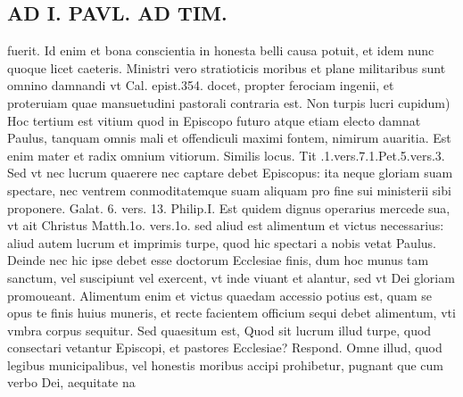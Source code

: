 \documentclass{article}
\begin{document}
\begin{pages}
\section*{AD I. PAVL. AD TIM. }
\marginpar{[ p.138. ]}\pstart fuerit. Id enim et bona conscientia in honesta belli causa potuit, et idem nunc quoque licet caeteris. Ministri vero stratioticis moribus et plane militaribus sunt omnino damnandi vt Cal. epist.354. docet, propter ferociam ingenii, et proteruiam quae mansuetudini pastorali contraria est.  \pend\pstart Non turpis lucri cupidum) Hoc tertium est vitium quod in Episcopo futuro atque etiam electo damnat Paulus, tanquam omnis mali et offendiculi maximi fontem, nimirum auaritia. Est enim mater et radix omnium vitiorum. Similis locus. Tit .1.vers.7.1.Pet.5.vers.3. Sed vt nec lucrum quaerere nec captare debet Episcopus: ita neque gloriam suam spectare, nec ventrem conmoditatemque suam aliquam pro fine sui ministerii sibi proponere. Galat. 6. vers. 13. Philip.I. Est quidem dignus operarius mercede sua, vt ait Christus Matth.1o. vers.1o. sed aliud est alimentum et victus necessarius: aliud autem lucrum et imprimis turpe, quod hic spectari a nobis vetat Paulus. Deinde nec hic ipse debet esse doctorum Ecclesiae finis, dum hoc munus tam sanctum, vel suscipiunt vel exercent, vt inde viuant et alantur, sed vt Dei gloriam promoueant. Alimentum enim et victus quaedam accessio potius est, quam se opus te finis huius muneris, et recte facientem officium sequi debet alimentum, vti vmbra corpus sequitur. Sed quaesitum est, Quod sit lucrum illud turpe, quod consectari vetantur Episcopi, et pastores Ecclesiae? Respond. Omne illud, quod legibus municipalibus, vel honestis moribus accipi prohibetur, pugnant que cum verbo Dei, aequitate na\pend

\end{pages}
\end{document}
